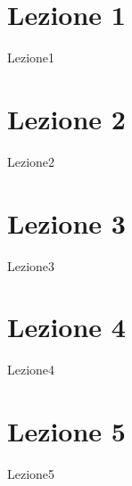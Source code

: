 \documentclass[openany,12pt]{article}
\begin{document}
\newpage

\section{Lezione 1}
{Lezione1}

\newpage

\section{Lezione 2}
{Lezione2}

\newpage

\section{Lezione 3}
{Lezione3}

\newpage

\section{Lezione 4}
{Lezione4}

\newpage

\section{Lezione 5}
{Lezione5}
\end{document}
